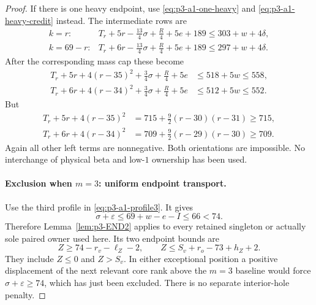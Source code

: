 \documentclass[11pt,letterpaper]{article}
\theoremstyle{definition}\newtheorem{definition}[theorem]{Definition}
\begin{document}
\begin{proof}
If there is one heavy endpoint, use \eqref{eq:p3-a1-one-heavy} and
\eqref{eq:p3-a1-heavy-credit} instead. The intermediate rows are
\[
 \begin{array}{ll}
 k=r:&T_r+5r-\frac{13}{4}\sigma+\frac R4+5e+189
       \le303+w+4\delta,\\
 k=69-r:&T_r+6r-\frac{13}{4}\sigma+\frac R4+5e+189
       \le297+w+4\delta.
 \end{array}
\]
After the corresponding mass cap these become
\begin{align}
 T_r+5r+4(r-35)^2+\frac34\sigma+\frac R4+5e
 &\le518+5w\le558,\label{eq:p3-a1-m2s-heavy-final}\\
 T_r+6r+4(r-34)^2+\frac34\sigma+\frac R4+5e
 &\le512+5w\le552.\label{eq:p3-a1-m2t-heavy-final}
\end{align}
But
\begin{align}
 T_r+5r+4(r-35)^2
 &=715+\frac92(r-30)(r-31)\ge715,\label{eq:p3-a1-q2s-heavy}\\
 T_r+6r+4(r-34)^2
 &=709+\frac92(r-29)(r-30)\ge709.\label{eq:p3-a1-q2t-heavy}
\end{align}
Again all other left terms are nonnegative. Both orientations are
impossible. No interchange of physical beta and low-$1$ ownership has
been used.

\paragraph{Exclusion when $m=3$: uniform endpoint transport.}
Use the third profile in \eqref{eq:p3-a1-profile3}. It gives
\[
 \sigma+\varepsilon\le69+w-e-I\le66<74.
\]
Therefore Lemma~\ref{lem:p3-END2} applies to every retained singleton
or actually sole paired owner used here. Its two endpoint bounds are
\begin{equation}\label{eq:p3-a1-m3-END2}
 Z\ge74-r_v-\ell_Z-2,\qquad
 Z\le S_v+r_o-73+h_Z+2.
\end{equation}
They include $Z\le0$ and $Z>S_v$. In either exceptional position a
positive displacement of the next relevant core rank above the
$m=3$ baseline would force $\sigma+\varepsilon\ge74$, which has
just been excluded. There is no separate interior-hole penalty.


\end{proof}
\end{document}
